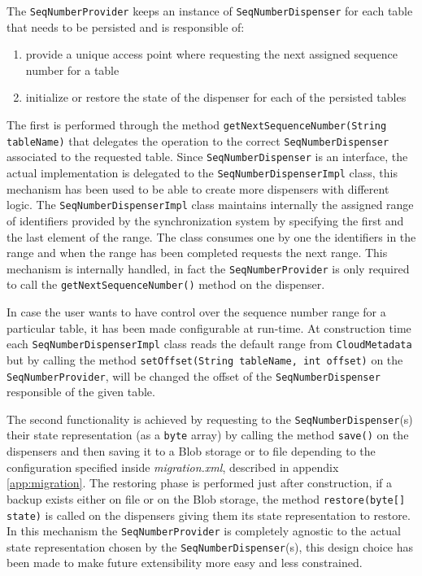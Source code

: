 \noindent The \texttt{SeqNumberProvider} keeps an instance of \texttt{SeqNumberDispenser} for each table that needs to be persisted and is responsible of:
\begin{enumerate}
\item provide a unique access point where requesting the next assigned sequence number for a table
\item initialize or restore the state of the dispenser for each of the persisted tables
\end{enumerate}
\noindent The first is performed through the method \texttt{getNextSequenceNumber(String tableName)} that delegates the operation to the correct \texttt{SeqNumberDispenser} associated to the requested table.
Since \texttt{SeqNumberDispenser} is an interface, the actual implementation is delegated to the \texttt{SeqNumberDispenserImpl} class, this mechanism has been used to be able to create more dispensers with different logic.
\noindent The \texttt{SeqNumberDispenserImpl} class maintains internally the assigned range of identifiers provided by the synchronization system by specifying the first and the last element of the range. The class consumes one by one the identifiers in the range and when the range has been completed requests the next range. This mechanism is internally handled, in fact the \texttt{SeqNumberProvider} is only required to call the \texttt{getNextSequenceNumber()} method on the dispenser.

\noindent In case the user wants to have control over the sequence number range for a particular table, it has been made configurable at run-time. At construction time each \texttt{SeqNumberDispenserImpl}  class reads the default range from \texttt{CloudMetadata} but by calling the method \texttt{setOffset(String tableName, int offset)} on the \texttt{SeqNumberProvider}, will be changed the offset of the \texttt{SeqNumberDispenser} responsible of the given table.

\newparagraph The second functionality is achieved by requesting to the \texttt{SeqNumberDispenser}(s) their state representation (as a \texttt{byte} array) by calling the method \texttt{save()} on the dispensers and then saving it to a Blob storage or to file depending to the configuration specified inside \textit{migration.xml}, described in appendix \ref{app:migration}. 
\noindent The restoring phase is performed just after construction, if a backup exists either on file or on the Blob storage, the method \texttt{restore(byte[] state)} is called on the dispensers giving them its state representation to restore.
In this mechanism the \texttt{SeqNumberProvider} is completely agnostic to the actual state representation chosen by the \texttt{SeqNumberDispenser}(s), this design choice has been made to make future extensibility more easy and less constrained.

